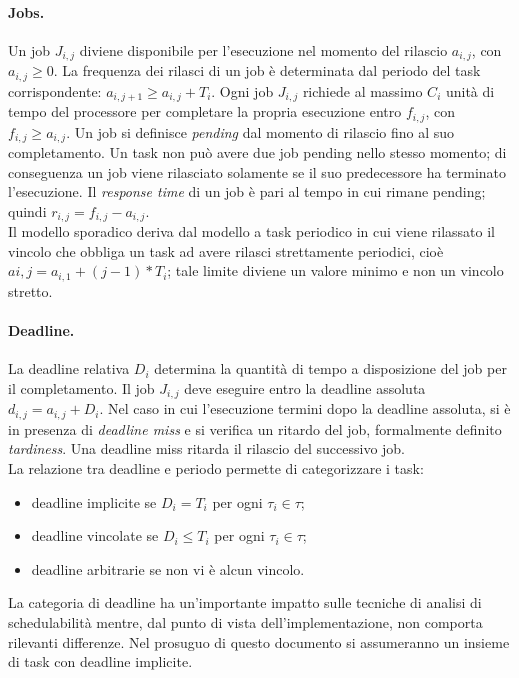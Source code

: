 \paragraph{Jobs.} Un job $J_{i,j}$ diviene disponibile per l'esecuzione nel momento del rilascio $a_{i,j}$, con $a_{i,j} \geq 0$. La frequenza dei rilasci di un job è determinata dal periodo del task corrispondente: $a_{i,j+1} ≥ a_{i,j} + T_i$. Ogni job $J_{i,j}$ richiede al massimo $C_i$ unità di tempo del processore per completare la propria esecuzione entro $f_{i,j}$, con $f_{i,j} \geq a_{i,j}$. Un job si definisce \textit{pending} dal momento di rilascio fino al suo completamento. Un task non può avere due job pending nello stesso momento; di conseguenza un job viene rilasciato solamente se il suo predecessore ha terminato l'esecuzione. Il \textit{response time} di un job è pari al tempo in cui rimane pending; quindi $r_{i,j} = f_{i,j} − a_{i,j}$.\\
Il modello sporadico deriva dal modello a task periodico in cui viene rilassato il vincolo che obbliga un task ad avere rilasci strettamente periodici, cioè $ai,j = a_{i,1} + (j − 1) * T_i$; tale limite diviene un valore minimo e non un vincolo stretto.

\paragraph{Deadline.} La deadline relativa $D_i$ determina la quantità di tempo a disposizione del job per il completamento. Il job $J_{i,j}$ deve eseguire entro la deadline assoluta $d_{i,j} = a_{i,j} + D_i$. Nel caso in cui l'esecuzione termini dopo la deadline assoluta, si è in presenza di \textit{deadline miss} e si verifica un ritardo del job, formalmente definito \textit{tardiness}. Una deadline miss ritarda il rilascio del successivo job.\\
La relazione tra deadline e periodo permette di categorizzare i task:

\begin{itemize}
	\item deadline implicite se $D_i = T_i$ per ogni $\tau_i \in \tau$;
	\item deadline vincolate se $D_i \leq T_i$ per ogni $\tau_i \in \tau$;
	\item deadline arbitrarie se non vi è alcun vincolo.
\end{itemize}

La categoria di deadline ha un'importante impatto sulle tecniche di analisi di schedulabilità mentre, dal punto di vista dell'implementazione, non comporta rilevanti differenze. Nel prosuguo di questo documento si assumeranno un insieme di task con deadline implicite.\\

